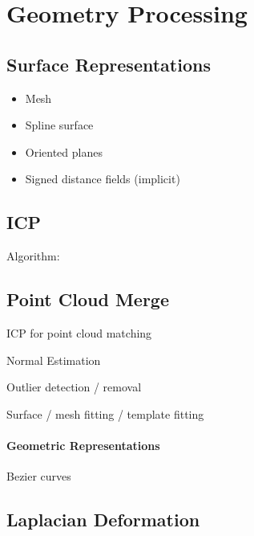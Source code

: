 \chapter{Geometry Processing} 

\section{ Surface Representations}
\begin{itemize}
\item Mesh
\item Spline surface
\item Oriented planes
\item Signed distance fields (implicit)
\end{itemize}

\section{ICP}

Algorithm:

\section{Point Cloud Merge}

ICP for point cloud matching

Normal Estimation

Outlier detection / removal 

Surface / mesh fitting / template fitting

\subsubsection{Geometric Representations}

Bezier curves

\section{Laplacian Deformation}